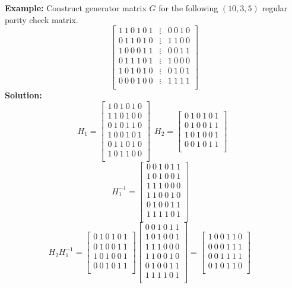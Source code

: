 \textbf{Example:} Construct generator matrix $G$ for the following $(10, 3, 5)$ regular parity check matrix.
\[\left[\begin{matrix}1\ 1\ 0\ 1\ 0\ 1&\vdots&0\ 0\ 1\ 0\\0\ 1\ 1\ 0\ 1\ 0&\vdots&1\ 1\ 0\ 0\\1\ 0\ 0\ 0\ 1\ 1&\vdots&0\ 0\ 1\ 1\\0\ 1\ 1\ 1\ 0\ 1&\vdots&1\ 0\ 0\ 0\\1\ 0\ 1\ 0\ 1\ 0&\vdots&0\ 1\ 0\ 1\\0\ 0\ 0\ 1\ 0\ 0&\vdots&1\ 1\ 1\ 1\\\end{matrix}\right]\]
\textbf{Solution:}
\[H_1=\left[\begin{matrix}1\ 0\ 1\ 0\ 1\ 0\\1\ 1\ 0\ 1\ 0\ 0\\0\ 1\ 0\ 1\ 1\ 0\\1\ 0\ 0\ 1\ 0\ 1\\0\ 1\ 1\ 0\ 1\ 0\\1\ 0\ 1\ 1\ 0\ 0\\\end{matrix}\right]\ \ H_2=\left[\begin{matrix}0\ 1\ 0\ 1\ 0\ 1\\0\ 1\ 0\ 0\ 1\ 1\\1\ 0\ 1\ 0\ 0\ 1\\0\ 0\ 1\ 0\ 1\ 1\\\end{matrix}\right]\ \ \] 
\[H_1^{-1}=\left[\begin{matrix}0\ 0\ 1\ 0\ 1\ 1\\1\ 0\ 1\ 0\ 0\ 1\\1\ 1\ 1\ 0\ 0\ 0\\1\ 1\ 0\ 0\ 1\ 0\\0\ 1\ 0\ 0\ 1\ 1\\1\ 1\ 1\ 1\ 0\ 1\\\end{matrix}\right]\ \ \ \ \]
\[H_2H_1^{-1}=\left[\begin{matrix}0\ 1\ 0\ 1\ 0\ 1\\0\ 1\ 0\ 0\ 1\ 1\\1\ 0\ 1\ 0\ 0\ 1\\0\ 0\ 1\ 0\ 1\ 1\\\end{matrix}\right]\left[\begin{matrix}0\ 0\ 1\ 0\ 1\ 1\\1\ 0\ 1\ 0\ 0\ 1\\1\ 1\ 1\ 0\ 0\ 0\\1\ 1\ 0\ 0\ 1\ 0\\0\ 1\ 0\ 0\ 1\ 1\\1\ 1\ 1\ 1\ 0\ 1\\\end{matrix}\right]=\left[\begin{matrix}1\ 0\ 0\ 1\ 1\ 0\\0\ 0\ 0\ 1\ 1\ 1\\0\ 0\ 1\ 1\ 1\ 1\\0\ 1\ 0\ 1\ 1\ 0\\\end{matrix}\right]\ \ \ \ \ \]
